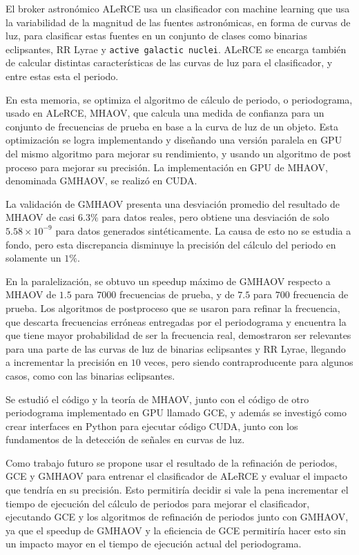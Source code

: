 
El broker astronómico ALeRCE usa un clasificador con machine learning que usa la variabilidad de la magnitud de las fuentes astronómicas, en forma de curvas de luz, para clasificar estas fuentes en un conjunto de clases como binarias eclipsantes, RR Lyrae y \texttt{active galactic nuclei}. ALeRCE se encarga también de calcular distintas características de las curvas de luz para el clasificador, y entre estas esta el periodo.

En esta memoria, se optimiza el algoritmo de cálculo de periodo, o periodograma, usado en ALeRCE, MHAOV, que calcula una medida de confianza para un conjunto de frecuencias de prueba en base a la curva de luz de un objeto. Esta optimización se logra implementando y diseñando una versión paralela en GPU del mismo algoritmo para mejorar su rendimiento, y usando un algoritmo de post proceso para mejorar su precisión. La implementación en GPU de MHAOV, denominada GMHAOV, se realizó en CUDA.

La validación de GMHAOV presenta una desviación promedio del resultado de MHAOV de casi $6.3\%$ para datos reales, pero obtiene una desviación de solo $5.58 \times 10^{-9}$ para datos generados sintéticamente. La causa de esto no se estudia a fondo, pero esta discrepancia disminuye la precisión del cálculo del periodo en solamente un $1\%$.

En la paralelización, se obtuvo un speedup máximo de GMHAOV respecto a MHAOV de $1.5$ para $7000$ frecuencias de prueba, y de $7.5$ para $700$ frecuencia de prueba. Los algoritmos de postproceso que se usaron para refinar la frecuencia, que descarta frecuencias erróneas entregadas por el periodograma y encuentra la que tiene mayor probabilidad de ser la frecuencia real, demostraron ser relevantes para una parte de las curvas de luz de binarias eclipsantes y RR Lyrae, llegando a incrementar la precisión en $10$ veces, pero siendo contraproducente para algunos casos, como con las binarias eclipsantes.

Se estudió el código y la teoría de MHAOV, junto con el código de otro periodograma implementado en GPU llamado GCE, y además se investigó como crear interfaces en Python para ejecutar código CUDA, junto con los fundamentos de la detección de señales en curvas de luz.

Como trabajo futuro se propone usar el resultado de la refinación de periodos, GCE y GMHAOV para entrenar el clasificador de ALeRCE y evaluar el impacto que tendría en su precisión. Esto permitiría decidir si vale la pena incrementar el tiempo de ejecución del cálculo de periodos para mejorar el clasificador, ejecutando GCE y los algoritmos de refinación de periodos junto con GMHAOV, ya que el speedup de GMHAOV y la eficiencia de GCE permitiría hacer esto sin un impacto mayor en el tiempo de ejecución actual del periodograma.




